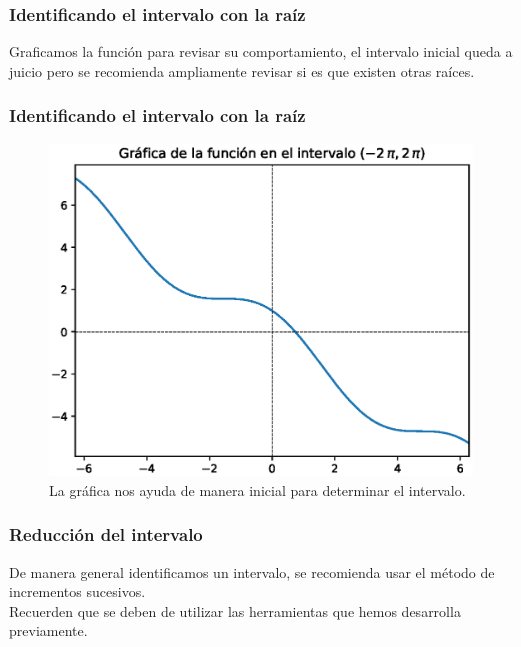 \begin{frame}
\frametitle{Identificando el intervalo con la raíz}
Graficamos la función para revisar su comportamiento, el intervalo inicial queda a juicio pero se recomienda ampliamente revisar si es que existen otras raíces.\end{frame}
\begin{frame}
\frametitle{Identificando el intervalo con la raíz}

\begin{figure}[h!]
	\centering
	\includegraphics[scale=0.5]{Imagenes/raices_falsaposicion_01.eps}
	\caption{La gráfica nos ayuda de manera inicial para determinar el intervalo.}
\end{figure}
\end{frame}
\begin{frame}
\frametitle{Reducción del intervalo}
De manera general identificamos un intervalo, se recomienda usar el método de incrementos sucesivos.
\\
\bigskip
Recuerden que se deben de utilizar las herramientas que hemos desarrolla previamente.
\end{frame}
